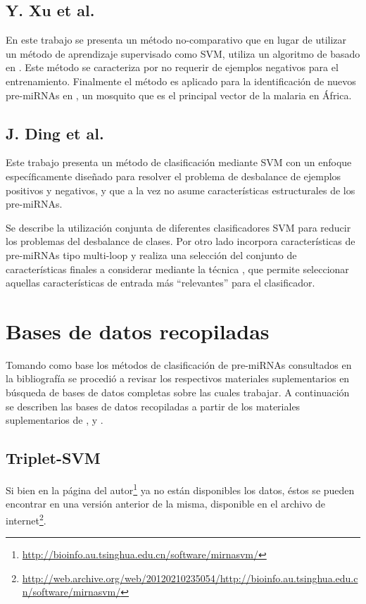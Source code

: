 \documentclass[12pt,bibliography=oldstyle,DIV=12,parskip=half-,titlepage]{scrartcl}
\begin{document}
\subsection{Y. Xu et al. \cite{xu}}
En este trabajo se presenta un método no-comparativo que en lugar de
utilizar un método de aprendizaje supervisado como SVM, utiliza un
algoritmo de  basado en .  Este método
se caracteriza por no requerir de ejemplos negativos para el
entrenamiento. Finalmente el método es aplicado para la identificación
de nuevos pre-miRNAs en , un mosquito que es el
principal vector de la malaria en África.
%
\subsection{J. Ding et al. \cite{ding}}
Este trabajo presenta un método de clasificación mediante SVM con un
enfoque específicamente diseñado para resolver el problema de
desbalance de ejemplos positivos y negativos, y que a la vez no asume
características estructurales de los pre-miRNAs.

Se describe la utilización conjunta de diferentes clasificadores SVM
para reducir los problemas del desbalance de clases. Por otro lado
incorpora características de pre-miRNAs tipo multi-loop y realiza una
selección del conjunto de características finales a considerar
mediante la técnica , que permite seleccionar aquellas
características de entrada más ``relevantes'' para el clasificador.
%
%
%
%
\section{Bases de datos recopiladas}
%
Tomando como base los métodos de clasificación de pre-miRNAs
consultados en la bibliografía se procedió a revisar los respectivos
materiales suplementarios en búsqueda de bases de datos completas
sobre las cuales trabajar.  A continuación se describen las bases de
datos recopiladas a partir de los materiales suplementarios de
\cite{xue}, \cite{ng} y \cite{batuwita}.
%
\subsection{Triplet-SVM \cite{xue}}
%
Si bien en la página del
autor\footnote{\url{http://bioinfo.au.tsinghua.edu.cn/software/mirnasvm/}}
ya no están disponibles los datos, éstos se pueden encontrar en una
versión anterior de la misma, disponible en el archivo de
internet\footnote{\url{http://web.archive.org/web/20120210235054/http://bioinfo.au.tsinghua.edu.cn/software/mirnasvm/}}.
\end{document}
